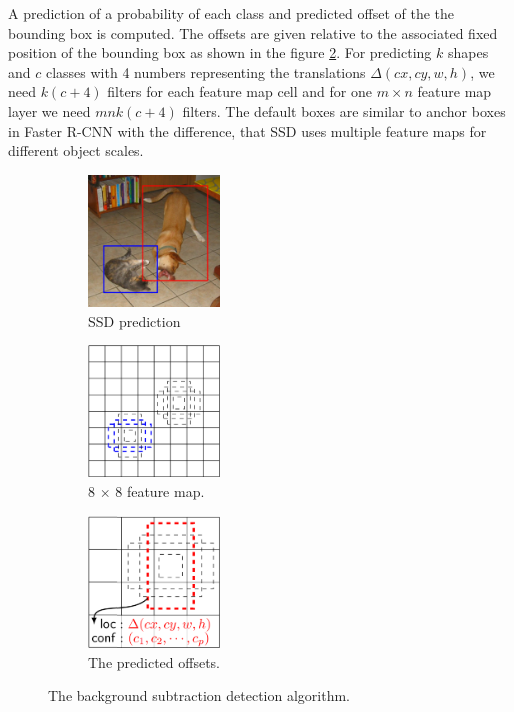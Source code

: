 \documentclass[a4paper,12pt,titlepage]{article}
\numberwithin{figure}{section}
\begin{document}
A prediction of a probability of each class and predicted offset of the the bounding box is computed. The offsets are given relative to the associated fixed position of the bounding box as shown in the figure \ref{fig:ssd4}. For predicting $k$ shapes and $c$ classes with 4 numbers representing the translations $\Delta(cx, cy, w, h)$, we need $k(c+4)$ filters for each feature map cell and for one $m \times n$ feature map layer we need $mnk(c+4)$ filters. The default boxes are similar to anchor boxes in Faster R-CNN with the difference, that SSD uses multiple feature maps for different object scales. 


\begin{figure}
    \begin{subfigure}[Sample1]{0.3\linewidth}
    	\includegraphics[height=35mm, width=35mm]{fig/ssd_dog_cat.png} 
        \caption{SSD prediction}
        \label{fig:ssd_detection}   
    \end{subfigure}
    \quad
    \begin{subfigure}[Sample1]{0.3\linewidth} 
    	\includegraphics[height=35mm, width=35mm]{fig/ssd_feature_map.png}
        \caption{8 $\times$ 8 feature map.}   
        \label{fig:ssd4}
    \end{subfigure} 
    \quad
    \begin{subfigure}[Sample1]{0.3\linewidth} 
    	\includegraphics[height=35mm, width=35mm]{fig/ssd_4_feature_map.png}
        \caption{The predicted offsets.}   
        \label{fig:ssd8}
    \end{subfigure} 
    \caption{The background subtraction detection algorithm.}
\end{figure}
\end{document}

